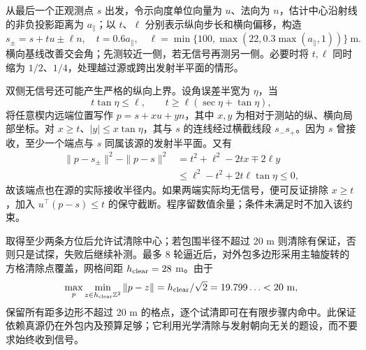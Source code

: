 从最后一个正观测点 $s$ 出发，令示向度单位向量为 $u$、法向为 $n$，估计中心沿射线的非负投影距离为 $a_{\parallel}$；以 $t$、$\ell$ 分别表示纵向步长和横向偏移，构造
\begin{equation}\label{eq:q4-baseline}
 s_\pm=s+tu\pm\ell n,\quad t=0.6a_{\parallel},\quad
 \ell=\min\{100,\max(22,0.3\max(a_{\parallel},1))\}\ \mathrm{m}.
\end{equation}
横向基线改善交会角；先测较近一侧，若无信号再测另一侧。必要时将 $t,\ell$ 同时缩为 $1/2$、$1/4$，处理越过源或跨出发射半平面的情形。

双侧无信号还可能产生严格的纵向上界。设角误差半宽为 $\eta$，当
\begin{equation}\label{eq:q4-pair-condition}
 t\tan\eta\le\ell,\qquad
 t\ge\ell(\sec\eta+\tan\eta),
\end{equation}
将任意楔内远端位置写作 $p=s+xu+yn$，其中 $x,y$ 为相对于测站的纵、横向局部坐标。对 $x\ge t$、$|y|\le x\tan\eta$，其与 $s$ 的连线经过横截线段 $s_-s_+$。因为 $s$ 曾接收，至少一个端点与 $s$ 同属该源的发射半平面。又有
\begin{equation}\label{eq:q4-pair-proof}
 \begin{aligned}
 \|p-s_\pm\|^2-\|p-s\|^2
 &=t^2+\ell^2-2tx\mp2\ell y\\
 &\le\ell^2-t^2+2t\ell\tan\eta\le0,
 \end{aligned}
\end{equation}
故该端点也在源的实际接收半径内。如果两端实际均无信号，便可反证排除 $x\ge t$，加入 $u^\top(p-s)\le t$ 的保守截断。程序留数值余量；条件未满足时不加入该约束。

取得至少两条方位后允许试清除中心；若包围半径不超过 20 m 则清除有保证，否则只是试探，失败后继续补测。最多 8 轮逼近后，对外包多边形采用主轴旋转的方格清除点覆盖，网格间距 $h_{\rm clear}=28$ m。由于
\begin{equation}\label{eq:q4-clear-cover}
 \max_p\min_{z\in h_{\rm clear}\mathbb Z^2}\|p-z\|=h_{\rm clear}/\sqrt2=19.799\ldots<20\ \mathrm{m},
\end{equation}
保留所有距多边形不超过 20 m 的格点，逐个试清即可在有限步骤内命中。此保证依赖真源仍在外包内及预算足够；它利用光学清除与发射朝向无关的题设，而不要求始终收到信号。

